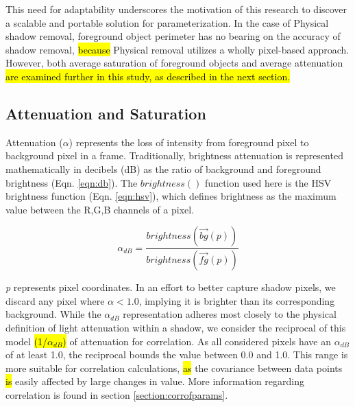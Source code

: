 
This need for adaptability underscores the motivation of this research to discover a scalable and portable solution for parameterization. In the case of Physical shadow removal, foreground object perimeter has no bearing on the accuracy of shadow removal, \hl{because} Physical removal utilizes a wholly pixel-based approach. However, both average saturation of foreground objects and average attenuation \hl{are examined further in this study, as described in the next section.}

\subsection{Attenuation and Saturation}

 Attenuation ($\alpha$) represents the loss of intensity from foreground pixel to background pixel in a frame. Traditionally, brightness attenuation is represented mathematically in decibels (dB) as the ratio of background and foreground brightness (Eqn. \ref{eqn:db}). The $brightness()$ function used here is the HSV brightness function (Eqn. \ref{eqn:hsv}), which defines brightness as the maximum value between the R,G,B channels of a pixel. 

\begin{equation}
\alpha_{dB} = \dfrac{brightness(\vec{bg}(p))}{brightness(\vec{fg}(p))}
\label{eqn:db}
\end{equation}

\textit{p} represents pixel coordinates. In an effort to better capture shadow pixels, we discard any pixel where $\alpha < 1.0$, implying it is brighter than its corresponding background. While the $\alpha_{dB}$ representation adheres most closely to the physical definition of light attenuation within a shadow, we consider the reciprocal of this model \hl{(1/$\alpha_{dB}$)} of attenuation for correlation. As all considered pixels have an $\alpha_{dB}$ of at least 1.0, the reciprocal bounds the value between 0.0 and 1.0. This range is more suitable for correlation calculations, \hl{as} the covariance between data points \hl{is} easily affected by large changes in value. More information regarding correlation is found in section \ref{section:corrofparams}.

